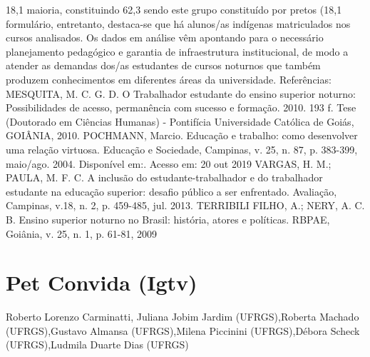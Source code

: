 18,1%
maioria, constituindo 62,3%
sendo este grupo constituído por pretos (18,1%
formulário, entretanto, destaca-se que há alunos/as indígenas matriculados nos cursos analisados. Os dados em
análise vêm apontando para o necessário planejamento pedagógico e garantia de infraestrutura institucional, de
modo a atender as demandas dos/as estudantes de cursos noturnos que também produzem conhecimentos em
diferentes áreas da universidade.
Referências:
MESQUITA, M. C. G. D. O Trabalhador estudante do ensino superior noturno: Possibilidades de acesso,
permanência com sucesso e formação. 2010. 193 f. Tese (Doutorado em Ciências Humanas) - Pontifícia
Universidade Católica de Goiás, GOIÂNIA, 2010.
POCHMANN, Marcio. Educação e trabalho: como desenvolver uma relação virtuosa. Educação e Sociedade,
Campinas, v. 25, n. 87, p. 383-399, maio/ago. 2004. Disponível em:. Acesso em: 20
out 2019
VARGAS, H. M.; PAULA, M. F. C. A inclusão do estudante-trabalhador e do trabalhador estudante na educação
superior: desafio público a ser enfrentado. Avaliação, Campinas, v.18, n. 2, p. 459-485, jul. 2013.
TERRIBILI FILHO, A.; NERY, A. C. B. Ensino superior noturno no Brasil: história, atores e políticas. RBPAE,
Goiânia, v. 25, n. 1, p. 61-81, 2009




\section*{Pet Convida (Igtv)}

Roberto Lorenzo Carminatti, Juliana Jobim Jardim (UFRGS),Roberta Machado (UFRGS),Gustavo Almansa (UFRGS),Milena Piccinini (UFRGS),Débora Scheck (UFRGS),Ludmila Duarte Dias (UFRGS)


